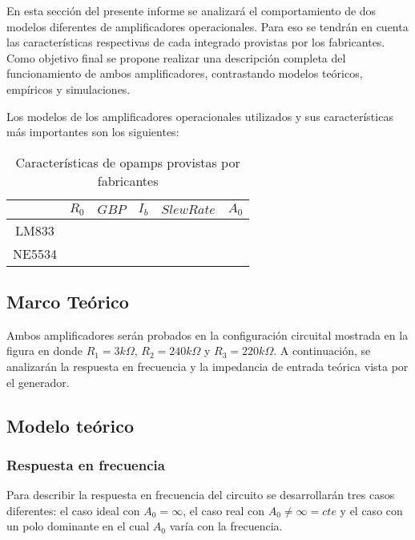 En esta sección del presente informe se analizará el comportamiento de dos modelos diferentes de amplificadores operacionales. Para eso se tendrán en cuenta las características respectivas de cada integrado provistas por los fabricantes. Como objetivo final se propone realizar una descripción completa del funcionamiento de ambos amplificadores, contrastando modelos teóricos, empíricos y simulaciones. 


Los modelos de los amplificadores operacionales utilizados y sus características más importantes son los siguientes:

\begin{table}[H]
	\begin{center}
		\begin{tabular}{c c c c c c}
		     & $R_0$ & $GBP$ & $I_b$ & $Slew Rate$ & $A_0$ \\
		\hline
		LM833 & & & & & \\
		NE5534 & & & & & 
		\end{tabular}
		
		\caption{Características de opamps provistas por fabricantes}
	\end{center}
\end{table}


\subsection{Marco Teórico}

Ambos amplificadores serán probados en la configuración circuital mostrada en la figura %
en donde $R_1 = 3k\Omega$, $R_2 = 240k\Omega$ y $R_3 = 220k\Omega$. A continuación, se analizarán la respuesta en frecuencia y la impedancia de entrada teórica vista por el generador.


\subsection{Modelo teórico}

\subsubsection{Respuesta en frecuencia}

Para describir la respuesta en frecuencia del circuito se desarrollarán tres casos diferentes: el caso ideal con $A_0 = \infty$, el caso real con $A_0 \neq \infty = cte $ y el caso con un polo dominante en el cual $A_0$ varía con la frecuencia.

